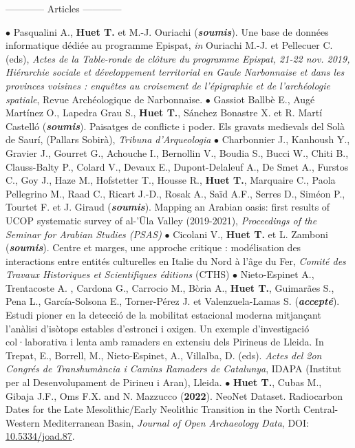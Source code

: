 \documentclass{article}
\begin{document}
\begin{center}------------ Articles ------------\end{center}
$\bullet$ Pasqualini A., \textbf{Huet T.} et M.-J. Ouriachi (\textit{\textbf{soumis}}). Une base de données informatique dédiée au programme Epispat, \textit{in} Ouriachi M.-J. et Pellecuer C. (eds), \textit{Actes de la Table-ronde de cl\^{o}ture du programme Epispat, 21-22 nov. 2019, Hi\'{e}rarchie sociale et d\'{e}veloppement territorial en Gaule Narbonnaise et dans les provinces voisines : enqu\^{e}tes au croisement de l'\'{e}pigraphie et de l'arch\'{e}ologie spatiale}, Revue Arch\'{e}ologique de Narbonnaise.
\smallbreak
$\bullet$ Gassiot Ballbè E., Augé Martínez O., Lapedra Grau S., \textbf{Huet T.}, Sánchez Bonastre X. et R. Martí Castelló (\textit{\textbf{soumis}}). Paisatges de conflicte i poder. Els gravats medievals del Solà de Saurí, (Pallars Sobirà), \textit{Tribuna d'Arqueologia}
\smallbreak
$\bullet$ Charbonnier J., Kanhoush Y., Gravier J., Gourret G., Achouche I., Bernollin V., Boudia S., Bucci W., Chiti B., Clauss-Balty P., Colard V., Devaux E., Dupont-Delaleuf A., De Smet A., Furstos C., Goy J., Haze M., Hofstetter T., Housse R., \textbf{Huet T.}, Marquaire C., Paola Pellegrino M., Raad C., Ricart J.-D., Rosak A., Saïd A.F., Serres D., Siméon P., Tourtet F. et J. Giraud (\textit{\textbf{soumis}}). Mapping an Arabian oasis: first results of UCOP systematic survey of al-'Ūla Valley
(2019-2021), \textit{Proceedings of the Seminar for Arabian Studies (PSAS)}
\smallbreak
$\bullet$ Cicolani V., \textbf{Huet T.} et L. Zamboni (\textit{\textbf{soumis}}). Centre et marges, une approche critique : modélisation des interactions entre entités culturelles en Italie du Nord à l'âge du Fer, \textit{Comit\'{e} des Travaux Historiques et Scientifiques \'{e}ditions} (CTHS)
\smallbreak
$\bullet$ Nieto-Espinet A., Trentacoste A. , Cardona G., Carrocio M.,  Bòria A., \textbf{Huet T.}, Guimarães S., Pena L., García-Solsona E., Torner-Pérez J. et  Valenzuela-Lamas S. (\textit{\textbf{accepté}}). Estudi pioner en la detecció de la mobilitat estacional moderna mitjançant l'anàlisi d'isòtops estables d'estronci i oxigen. Un exemple d'investigació col·laborativa i lenta amb ramaders en extensiu dels Pirineus de Lleida. In Trepat, E., Borrell, M., Nieto-Espinet, A., Villalba, D. (eds). \textit{Actes del 2on Congrés de Transhumància i Camins Ramaders de Catalunya}, IDAPA (Institut per al Desenvolupament de Pirineu i Aran), Lleida. 
\smallbreak
$\bullet$ \textbf{Huet T.}, Cubas M., Gibaja J.F., Oms F.X. and N. Mazzucco (\textbf{2022}). NeoNet Dataset. Radiocarbon Dates for the Late Mesolithic/Early Neolithic Transition in the North Central-Western Mediterranean Basin, \textit{Journal of Open Archaeology Data}, DOI: \href{http://doi.org/10.5334/joad.87}{10.5334/joad.87}.
\end{document}
